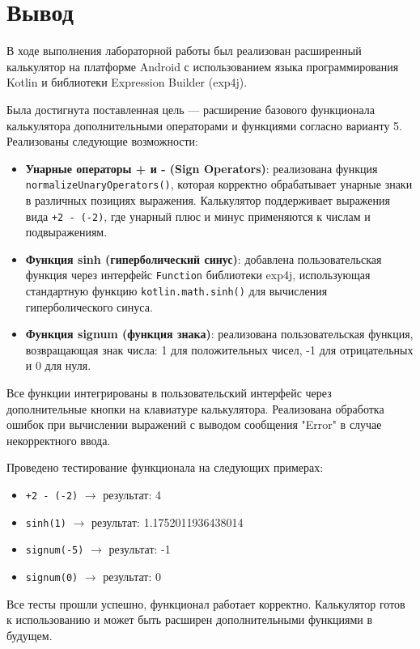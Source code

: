 \section{Вывод}

В ходе выполнения лабораторной работы был реализован расширенный калькулятор на платформе Android с использованием языка программирования Kotlin и библиотеки Expression Builder (exp4j). 

Была достигнута поставленная цель --- расширение базового функционала калькулятора дополнительными операторами и функциями согласно варианту 5. Реализованы следующие возможности:

\begin{itemize}
    \item \textbf{Унарные операторы + и - (Sign Operators)}: реализована функция \texttt{normalizeUnaryOperators()}, которая корректно обрабатывает унарные знаки в различных позициях выражения. Калькулятор поддерживает выражения вида \texttt{+2 - (-2)}, где унарный плюс и минус применяются к числам и подвыражениям.
    
    \item \textbf{Функция sinh (гиперболический синус)}: добавлена пользовательская функция через интерфейс \texttt{Function} библиотеки exp4j, использующая стандартную функцию \texttt{kotlin.math.sinh()} для вычисления гиперболического синуса.
    
    \item \textbf{Функция signum (функция знака)}: реализована пользовательская функция, возвращающая знак числа: 1 для положительных чисел, -1 для отрицательных и 0 для нуля.
\end{itemize}

Все функции интегрированы в пользовательский интерфейс через дополнительные кнопки на клавиатуре калькулятора. Реализована обработка ошибок при вычислении выражений с выводом сообщения "Error" в случае некорректного ввода.

Проведено тестирование функционала на следующих примерах:
\begin{itemize}
    \item \texttt{+2 - (-2)} $\rightarrow$ результат: 4
    \item \texttt{sinh(1)} $\rightarrow$ результат: 1.1752011936438014
    \item \texttt{signum(-5)} $\rightarrow$ результат: -1
    \item \texttt{signum(0)} $\rightarrow$ результат: 0
\end{itemize}

Все тесты прошли успешно, функционал работает корректно. Калькулятор готов к использованию и может быть расширен дополнительными функциями в будущем.


